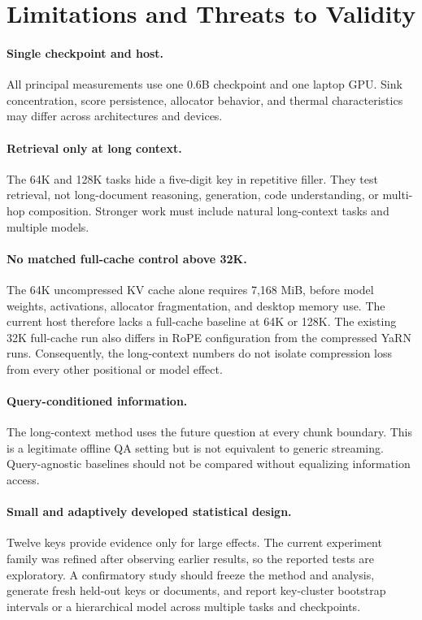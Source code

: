\documentclass[10pt,twocolumn]{article}
\begin{document}
\section{Limitations and Threats to Validity}
\paragraph{Single checkpoint and host.}
All principal measurements use one 0.6B checkpoint and one laptop GPU. Sink concentration, score persistence, allocator behavior, and thermal characteristics may differ across architectures and devices.

\paragraph{Retrieval only at long context.}
The 64K and 128K tasks hide a five-digit key in repetitive filler. They test retrieval, not long-document reasoning, generation, code understanding, or multi-hop composition. Stronger work must include natural long-context tasks and multiple models.

\paragraph{No matched full-cache control above 32K.}
The 64K uncompressed KV cache alone requires 7,168 MiB, before model weights, activations, allocator fragmentation, and desktop memory use. The current host therefore lacks a full-cache baseline at 64K or 128K. The existing 32K full-cache run also differs in RoPE configuration from the compressed YaRN runs. Consequently, the long-context numbers do not isolate compression loss from every other positional or model effect.

\paragraph{Query-conditioned information.}
The long-context method uses the future question at every chunk boundary. This is a legitimate offline QA setting but is not equivalent to generic streaming. Query-agnostic baselines should not be compared without equalizing information access.

\paragraph{Small and adaptively developed statistical design.}
Twelve keys provide evidence only for large effects. The current experiment family was refined after observing earlier results, so the reported tests are exploratory. A confirmatory study should freeze the method and analysis, generate fresh held-out keys or documents, and report key-cluster bootstrap intervals or a hierarchical model across multiple tasks and checkpoints.
\end{document}
